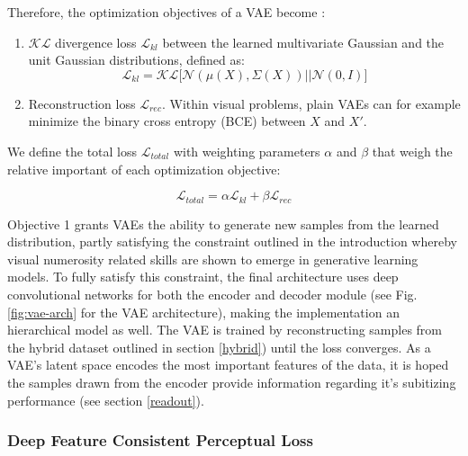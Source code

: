\documentclass[twocolumn]{article}
\providecommand{\tightlist}{%
  \setlength{\itemsep}{0pt}\setlength{\parskip}{0pt}}
\begin{document}
\noindent Therefore, the optimization objectives of a VAE become \citep{doersch2016tutorial}:

\begin{enumerate}[topsep=2pt]
\def\labelenumi{\arabic{enumi}.}
\tightlist 
\item \(\mathcal{KL}\) divergence loss \(\mathcal{L}_{kl}\) between the learned multivariate Gaussian and the unit Gaussian distributions, defined as:
  \[\mathcal{L}_{kl} = \mathcal{KL}\lbrack\mathcal{N}(\mu(X), \Sigma(X)) \vert\vert \mathcal{N}(0, I)\rbrack\]
\item
 Reconstruction loss \(\mathcal{L}_{rec}\). Within visual problems, plain VAEs can for
  example minimize the binary cross entropy (BCE) between \(X\) and
  \(X'\).
\end{enumerate}

\noindent We define the total loss \(\mathcal{L}_{total}\) with weighting parameters \(\alpha\) and \(\beta\) that weigh the relative important of each optimization objective:

\[\mathcal{L}_{total} = \alpha\mathcal{L}_{kl} + \beta\mathcal{L}_{rec} \tag{1}\]

\noindent Objective 1 grants VAEs the ability to generate new samples
from the learned distribution, partly satisfying the constraint outlined
in the introduction whereby visual numerosity related skills are shown to emerge in
generative learning models. To fully satisfy this constraint, the final
architecture uses deep convolutional networks for both the encoder and decoder
module (see Fig. \ref{fig:vae-arch} for the VAE architecture), making the
implementation an hierarchical model as well. The VAE is trained by reconstructing samples from the hybrid dataset outlined in section \ref{hybrid}) until the loss converges. As a VAE's latent space
encodes the most important features of the data, it is hoped the samples
drawn from the encoder provide information regarding it's subitizing
performance (see section \ref{readout}). 

\hypertarget{deep-feature-consistent-perceptual-loss}{%
\subsubsection{Deep Feature Consistent Perceptual
Loss}\label{deep-feature-consistent-perceptual-loss}}
\end{document}
